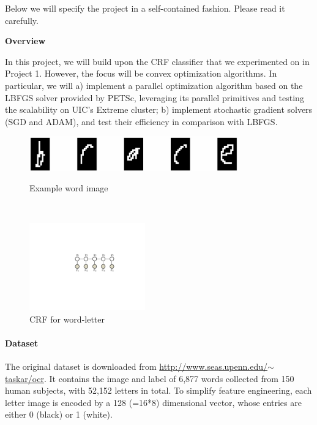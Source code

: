 \documentclass[11pt]{report}
\begin{document}
Below we will specify the project in a self-contained fashion.
Please read it carefully.


{\bf \large Overview}

In this project, we will build upon the CRF classifier that we experimented on in Project 1.
However, the focus will be convex optimization algorithms.
In particular, we will 
a) implement a parallel optimization algorithm based on the LBFGS solver provided by PETSc,
leveraging its parallel primitives and testing the scalability on UIC's Extreme cluster;
b) implement stochastic gradient solvers (SGD and ADAM), and test their efficiency in comparison with LBFGS.


\begin{figure}[b]
\begin{minipage}[b]{0.62\textwidth}
\centering
\vspace{-0.6em}
  \includegraphics[width=9cm]{brace.jpg}
  \vspace{0.6em}
  \caption{Example word image}\label{fig:brace}
\end{minipage}
~~~
\begin{minipage}[b]{0.33\textwidth}
\centering
  \includegraphics[width=5cm]{crf}
  \caption{CRF for word-letter}\label{fig:CRF_model}
\end{minipage}
\end{figure}








\paragraph{Dataset}
The original dataset is downloaded from \href{http://www.seas.upenn.edu/~taskar/ocr/}{http://www.seas.upenn.edu/$\sim$taskar/ocr}.
It contains the image and label of 6,877 words collected from 150 human subjects,
with 52,152 letters in total.
To simplify feature engineering, each letter image is encoded by a 128 (=16*8) dimensional vector,
whose entries are either 0 (black) or 1 (white).
\end{document}

